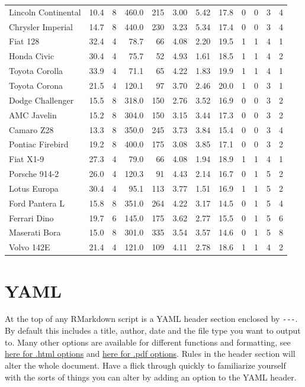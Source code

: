 \documentclass[]{book}
\begin{document}
\begin{longtable}{lrrrrrrrrrrr}
\addlinespace
Lincoln Continental & 10.4 & 8 & 460.0 & 215 & 3.00 & 5.42 & 17.8 & 0 & 0 & 3 & 4\\
Chrysler Imperial & 14.7 & 8 & 440.0 & 230 & 3.23 & 5.34 & 17.4 & 0 & 0 & 3 & 4\\
Fiat 128 & 32.4 & 4 & 78.7 & 66 & 4.08 & 2.20 & 19.5 & 1 & 1 & 4 & 1\\
Honda Civic & 30.4 & 4 & 75.7 & 52 & 4.93 & 1.61 & 18.5 & 1 & 1 & 4 & 2\\
Toyota Corolla & 33.9 & 4 & 71.1 & 65 & 4.22 & 1.83 & 19.9 & 1 & 1 & 4 & 1\\
\addlinespace
Toyota Corona & 21.5 & 4 & 120.1 & 97 & 3.70 & 2.46 & 20.0 & 1 & 0 & 3 & 1\\
Dodge Challenger & 15.5 & 8 & 318.0 & 150 & 2.76 & 3.52 & 16.9 & 0 & 0 & 3 & 2\\
AMC Javelin & 15.2 & 8 & 304.0 & 150 & 3.15 & 3.44 & 17.3 & 0 & 0 & 3 & 2\\
Camaro Z28 & 13.3 & 8 & 350.0 & 245 & 3.73 & 3.84 & 15.4 & 0 & 0 & 3 & 4\\
Pontiac Firebird & 19.2 & 8 & 400.0 & 175 & 3.08 & 3.85 & 17.1 & 0 & 0 & 3 & 2\\
\addlinespace
Fiat X1-9 & 27.3 & 4 & 79.0 & 66 & 4.08 & 1.94 & 18.9 & 1 & 1 & 4 & 1\\
Porsche 914-2 & 26.0 & 4 & 120.3 & 91 & 4.43 & 2.14 & 16.7 & 0 & 1 & 5 & 2\\
Lotus Europa & 30.4 & 4 & 95.1 & 113 & 3.77 & 1.51 & 16.9 & 1 & 1 & 5 & 2\\
Ford Pantera L & 15.8 & 8 & 351.0 & 264 & 4.22 & 3.17 & 14.5 & 0 & 1 & 5 & 4\\
Ferrari Dino & 19.7 & 6 & 145.0 & 175 & 3.62 & 2.77 & 15.5 & 0 & 1 & 5 & 6\\
\addlinespace
Maserati Bora & 15.0 & 8 & 301.0 & 335 & 3.54 & 3.57 & 14.6 & 0 & 1 & 5 & 8\\
Volvo 142E & 21.4 & 4 & 121.0 & 109 & 4.11 & 2.78 & 18.6 & 1 & 1 & 4 & 2\\*
\end{longtable}

\section{YAML}\label{yaml}

At the top of any RMarkdown script is a YAML header section enclosed by
\texttt{-\/-\/-}. By default this includes a title, author, date and the
file type you want to output to. Many other options are available for
different functions and formatting, see
\href{https://bookdown.org/yihui/rmarkdown/html-document.html}{here for
.html options} and
\href{https://bookdown.org/yihui/rmarkdown/pdf-document.html}{here for
.pdf options}. Rules in the header section will alter the whole
document. Have a flick through quickly to familiarize yourself with the
sorts of things you can alter by adding an option to the YAML header.
\end{document}
